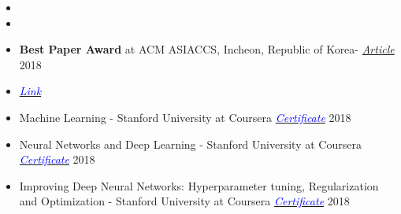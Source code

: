 
\begin{itemize}[noitemsep,topsep=0pt]
	\item {}
	\item {}
	\item \textbf{Best Paper Award} at ACM ASIACCS, Incheon, Republic of Korea- \href{https://www.bu.edu/eng/2018/08/14/best-paper-award-asia-conference-on-computer-and-communication-security-2018/}{ \textit{Article}} 2018
	\item {} \href{https://hdl.handle.net/2144/27051}{\textit{\textcolor{blue}{Link}}}
	\item Machine Learning - Stanford University at Coursera  \href{https://www.coursera.org/account/accomplishments/verify/U5YHWN3XSAQU}{\textit{\textcolor{blue}{Certificate}}} 2018
	\item Neural Networks and Deep Learning - Stanford University at Coursera \href{https://www.coursera.org/account/accomplishments/certificate/ZU26W977NR9P}{\textit{\textcolor{blue}{Certificate}}} 2018
	\item Improving Deep Neural Networks: Hyperparameter tuning, Regularization and Optimization - Stanford University at Coursera \href{https://www.coursera.org/account/accomplishments/certificate/U5YHWN3XSAQU}{\textit{\textcolor{blue}{Certificate}}} 2018\\
\end{itemize}